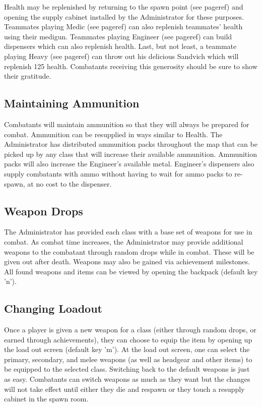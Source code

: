 Health may be replenished by returning to the spawn point (see {{pageref}}) and opening the supply cabinet installed by the Administrator for these purposes. Teammates playing Medic (see {{pageref}}) can also replenish teammates' health using their medigun. Teammates playing Engineer (see {{pageref}}) can build dispensers which can also replenish health. Last, but not least, a teammate playing Heavy (see {{pageref}}) can throw out his delicious Sandvich which will replenish 125 health.  Combatants receiving this generosity should be sure to show their gratitude.

\subsection{Maintaining Ammunition}
Combatants will maintain ammunition so that they will always be prepared for combat.  Ammunition can be resupplied in ways similar to Health.  The Administrator has distributed ammunition packs throughout the map that can be picked up by any class that will increase their available ammunition.  Ammunition packs will also increase the Engineer's available metal.  Engineer's dispensers also supply combatants with ammo without having to wait for ammo packs to re-spawn, at no cost to the dispenser.

\subsection{Weapon Drops}
The Administrator has provided each class with a base set of weapons for use in combat.  As combat time increases, the Administrator may provide additional weapons to the combatant through random drops while in combat. These will be given out after death.  Weapons may also be gained via achievement milestones. All found weapons and items can be viewed by opening the backpack (default key 'n'). 

\subsection{Changing Loadout}
Once a player is given a new weapon for a class (either through random drops, or earned through achievements), they can choose to equip the item by opening up the load out screen (default key 'm'). At the load out screen, one can select the primary, secondary, and melee weapons (as well as headgear and other items) to be equipped to the selected class.  Switching back to the default weapons is just as easy. Combatants can switch weapons as much as they want but the changes will not take effect until either they die and respawn or they touch a resupply cabinet in the spawn room.